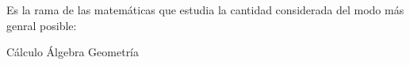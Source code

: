 
\question Es la rama de las matemáticas que estudia la cantidad considerada
          del modo más genral posible:

\begin{oneparchoices}
  \choice Cálculo
  \CorrectChoice Álgebra
  \choice Geometría
\end{oneparchoices}
